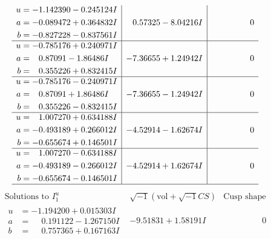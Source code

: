 \documentclass[1p]{elsarticle_modified}
\theoremstyle{definition}
\newcommand{\I}{\sqrt{-1}}
\begin{document}
$$\begin{array}{c|c|c}
\begin{aligned}
u &= -1.142390 - 0.245124 I \\
a &= -0.089472 + 0.364832 I \\
b &= -0.827228 - 0.837561 I\end{aligned}
 & \phantom{-}0.57325 - 8.04216 I & \phantom{-0.000000 } 0 \\ \hline\begin{aligned}
u &= -0.785176 + 0.240971 I \\
a &= \phantom{-}0.87091 - 1.86486 I \\
b &= \phantom{-}0.355226 + 0.832415 I\end{aligned}
 & -7.36655 + 1.24942 I & \phantom{-0.000000 } 0 \\ \hline\begin{aligned}
u &= -0.785176 - 0.240971 I \\
a &= \phantom{-}0.87091 + 1.86486 I \\
b &= \phantom{-}0.355226 - 0.832415 I\end{aligned}
 & -7.36655 - 1.24942 I & \phantom{-0.000000 } 0 \\ \hline\begin{aligned}
u &= \phantom{-}1.007270 + 0.634188 I \\
a &= -0.493189 + 0.266012 I \\
b &= -0.655674 + 0.146501 I\end{aligned}
 & -4.52914 - 1.62674 I & \phantom{-0.000000 } 0 \\ \hline\begin{aligned}
u &= \phantom{-}1.007270 - 0.634188 I \\
a &= -0.493189 - 0.266012 I \\
b &= -0.655674 - 0.146501 I\end{aligned}
 & -4.52914 + 1.62674 I & \phantom{-0.000000 } 0\\
 \hline 
 \end{array}$$\newpage$$\begin{array}{c|c|c}  
\text{Solutions to }I^u_{1}& \I (\text{vol} + \sqrt{-1}CS) & \text{Cusp shape}\\
 \hline 
\begin{aligned}
u &= -1.194200 + 0.015303 I \\
a &= \phantom{-}0.191122 - 1.267150 I \\
b &= \phantom{-}0.757365 + 0.167163 I\end{aligned}
 & -9.51831 + 1.58191 I & \phantom{-0.000000 } 0 \\ \hline\begin{aligned}

\end{aligned}
\end{array}$$
\end{document}
